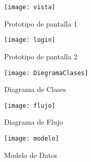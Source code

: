 \documentclass[12pt]{article}
\begin{document}
\begin{figure}
  \centering
      \texttt{[image: vista]}
	    \caption{Prototipo de pantalla 1}
	\label{fig:vista}
\end{figure}

\begin{figure}
  \centering
      \texttt{[image: login]}
	    \caption{Prototipo de pantalla 2}
	\label{fig:login}
\end{figure}

\begin{figure}
  \centering
      \texttt{[image: DiegramaClases]}
	    \caption{Diagrama de Clases}
	\label{fig:DiagramaClases}
\end{figure}

\begin{figure}
  \centering
      \texttt{[image: flujo]}
	    \caption{Diagrama de Flujo}
	\label{fig:diagramaflujo}
\end{figure}

\begin{figure}
  \centering
      \texttt{[image: modelo]}
	    \caption{Modelo de Datos}
	\label{fig:moddatos}
\end{figure}
\end{document}
